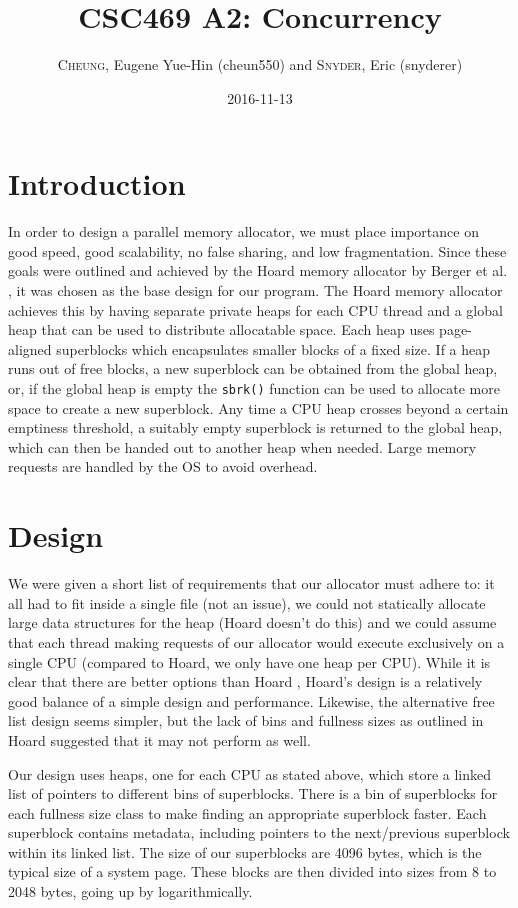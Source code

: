 \documentclass[11pt,twoside]{article}
\newcommand{\inlinecode}{\texttt}
\begin{document}
\title{CSC469 A2: Concurrency}
\author{\textsc{Cheung}, Eugene Yue-Hin (cheun550) and \textsc{Snyder}, Eric (snyderer)}
\date{2016-11-13}
\maketitle


\section{Introduction}
In order to design a parallel memory allocator, we must place importance on good speed, good scalability, no false sharing, and low fragmentation. Since these goals were outlined and achieved by the Hoard memory allocator by Berger et al. \cite{hoard}, it was chosen as the base design for our program. The Hoard memory allocator achieves this by having separate private heaps for each CPU thread and a global heap that can be used to distribute allocatable space. Each heap uses page-aligned superblocks which encapsulates smaller blocks of a fixed size. If a heap runs out of free blocks, a new superblock can be obtained from the global heap, or, if the global heap is empty the \inlinecode{sbrk()} function can be used to allocate more space to create a new superblock. Any time a CPU heap crosses beyond a certain emptiness threshold, a suitably empty superblock is returned to the global heap, which can then be handed out to another heap when needed. Large memory requests are handled by the OS to avoid overhead.


\section{Design}
We were given a short list of requirements that our allocator must adhere to: it all had to fit inside a single file (not an issue), we could not statically allocate large data structures for the heap (Hoard doesn't do this) and we could assume that each thread making requests of our allocator would execute exclusively on a single CPU (compared to Hoard, we only have one heap per CPU). While it is clear that there are better options than Hoard \cite{jemalloc}, Hoard's design is a relatively good balance of a simple design and performance. Likewise, the alternative free list design \cite{notes} seems simpler, but the lack of bins and fullness sizes as outlined in Hoard suggested that it may not perform as well.

Our design uses heaps, one for each CPU as stated above, which store a linked list of pointers to different bins of superblocks. There is a bin of superblocks for each fullness size class to make finding an appropriate superblock faster. Each superblock contains metadata, including pointers to the next/previous superblock within its linked list. The size of our superblocks are 4096 bytes, which is the typical size of a system page. These blocks are then divided into sizes from 8 to 2048 bytes, going up by logarithmically.
\end{document}
